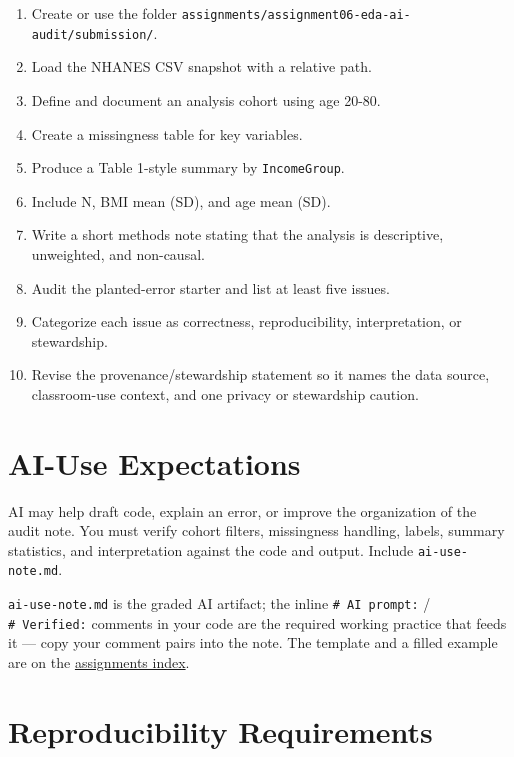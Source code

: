 \documentclass[
  letterpaper,
  DIV=11,
  numbers=noendperiod,
  oneside]{scrreprt}
\providecommand{\tightlist}{%
  \setlength{\itemsep}{0pt}\setlength{\parskip}{0pt}}
\begin{document}
\begin{enumerate}
\def\labelenumi{\arabic{enumi}.}
\tightlist
\item
  Create or use the folder
  \texttt{assignments/assignment06-eda-ai-audit/submission/}.
\item
  Load the NHANES CSV snapshot with a relative path.
\item
  Define and document an analysis cohort using age 20-80.
\item
  Create a missingness table for key variables.
\item
  Produce a Table 1-style summary by \texttt{IncomeGroup}.
\item
  Include N, BMI mean (SD), and age mean (SD).
\item
  Write a short methods note stating that the analysis is descriptive,
  unweighted, and non-causal.
\item
  Audit the planted-error starter and list at least five issues.
\item
  Categorize each issue as correctness, reproducibility, interpretation,
  or stewardship.
\item
  Revise the provenance/stewardship statement so it names the data
  source, classroom-use context, and one privacy or stewardship caution.
\end{enumerate}

\section{AI-Use Expectations}\label{ai-use-expectations-5}

AI may help draft code, explain an error, or improve the organization of
the audit note. You must verify cohort filters, missingness handling,
labels, summary statistics, and interpretation against the code and
output. Include \texttt{ai-use-note.md}.

\texttt{ai-use-note.md} is the graded AI artifact; the inline
\texttt{\#\ AI\ prompt:} / \texttt{\#\ Verified:} comments in your code
are the required working practice that feeds it --- copy your comment
pairs into the note. The template and a filled example are on the
\hyperref[the-official-ai-documentation-rule]{assignments index}.

\section{Reproducibility
Requirements}\label{reproducibility-requirements-5}
\end{document}
